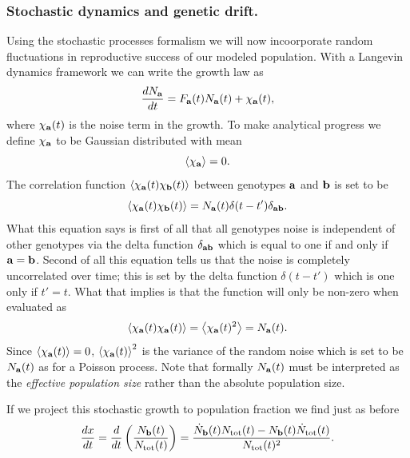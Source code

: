 \subsubsection{Stochastic dynamics and genetic drift.}

Using the stochastic processes formalism we will now incoorporate random
fluctuations in reproductive success of our modeled population. With a Langevin
dynamics framework we can write the growth law as
\begin{equation}
  {d{N_{\mathbf{a}}} \over dt} = F_{\mathbf{a}}(t) N_{\mathbf{a}}(t) + \chi_{\mathbf{a}}(t),
\end{equation}
where $\chi_{\mathbf{a}}(t)$ is the noise term in the growth. To make analytical
progress we define $\chi_{\mathbf{a}}$ to be Gaussian distributed with mean
\begin{equation}
  \left\langle \chi_{\mathbf{a}} \right\rangle = 0.
\end{equation}
The correlation function $\left\langle \chi_{\mathbf{a}}(t) \chi_{\mathbf{b}}(t) \right\rangle$ between
genotypes $\mathbf{a}$ and $\mathbf{b}$ is set to be
\begin{equation}
  \left\langle \chi_{\mathbf{a}}(t) \chi_{\mathbf{b}}(t) \right\rangle = N_{\mathbf{a}}(t)
                                           \delta(t - t') \delta_{\mathbf{ab}}.
\end{equation}
What this equation says is first of all that all genotypes noise is independent
of other genotypes via the delta function $\delta_{\mathbf{ab}}$ which is equal to one
if and only if $\mathbf{a} = \mathbf{b}$. Second of all this equation tells us that the
noise is completely uncorrelated over time; this is set by the delta function
$\delta(t - t')$ which is one only if $t' = t$. What that implies is that the
function will only be non-zero when evaluated as
\begin{equation}
  \left\langle \chi_{\mathbf{a}}(t) \chi_{\mathbf{a}}(t) \right\rangle = \left\langle \chi_{\mathbf{a}}(t)^2 \right\rangle =
  N_{\mathbf{a}}(t).
\end{equation}
Since $\left\langle \chi_{\mathbf{a}}(t) \right\rangle = 0$, $\left\langle \chi_{\mathbf{a}}(t) \right\rangle^2$ is the variance
of the random noise which is set to be $N_{\mathbf{a}}(t)$ as for a Poisson process.
Note that formally $N_{\mathbf{a}}(t)$ must be interpreted as the {\it effective
population size} rather than the absolute population size.

If we project this stochastic growth to population fraction we find just as
before
\begin{equation}
  {d{x} \over dt} = {d{} \over dt}\left( {N_{\mathbf{b}}(t) \over N_{\text{tot}}(t)} \right) =
  {\dot{N}_{\mathbf{b}}(t) N_{\text{tot}}(t) - N_{\mathbf{b}}(t) \dot{N}_{\text{tot}}(t) \over
     N_{\text{tot}}(t)^2}.
\end{equation}


